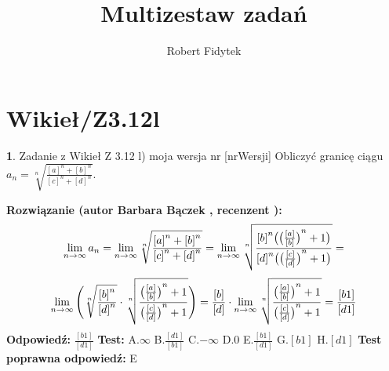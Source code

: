 \documentclass[12pt, a4paper]{article}
\title{Multizestaw zadań}
\author{Robert Fidytek}
\date{}
\theoremstyle{definition} %
\newtheorem{zad}{}
\newcommand{\kategoria}[1]{\section{#1}} %
\newcommand{\zadStart}[1]{\begin{zad}#1\newline} %
\newcommand{\zadStop}{\end{zad}}   %
\newcommand{\rozwStart}[2]{\noindent \textbf{Rozwiązanie (autor #1 , recenzent #2): }\newline} %
\newcommand{\rozwStop}{\newline}                                            %
\newcommand{\odpStart}{\noindent \textbf{Odpowiedź:}\newline}    %
\newcommand{\odpStop}{\newline}                                             %
\newcommand{\testStart}{\noindent \textbf{Test:}\newline} %
\newcommand{\testStop}{\newline} %
\newcommand{\kluczStart}{\noindent \textbf{Test poprawna odpowiedź:}\newline} %
\newcommand{\kluczStop}{\newline} %
\begin{document}
\maketitle


\kategoria{Wikieł/Z3.12l}
\zadStart{Zadanie z Wikieł Z 3.12 l) moja wersja nr [nrWersji]}
Obliczyć granicę ciągu $a_n= \sqrt[n]{\frac{{[a]}^n + {[b]}^n}{{[c]}^n +{[d]}^n}}$.
\zadStop
\rozwStart{Barbara Bączek}{}
$$\lim_{n \rightarrow \infty} a_n= \lim_{n \rightarrow \infty} \sqrt[n]{\frac{{[a]}^n + {[b]}^n}{{[c]}^n +{[d]}^n}}= \lim_{n \rightarrow \infty} \sqrt[n]{\frac{{[b]}^n\big{(}{\big{(}\frac{[a]}{[b]}\big{)}}^n +1\big{)}}{{[d]}^n\big{(}{\big{(}\frac{[c]}{[d]}\big{)}}^n +1\big{)}}}=$$
$$ \lim_{n \rightarrow \infty} \Bigg{(} \sqrt[n]{\frac{{[b]}^n}{{[d]}^n}} \cdot \sqrt[n]{\frac{{\big{(}\frac{[a]}{[b]}\big{)}}^n +1}{{\big{(}\frac{[c]}{[d]}\big{)}}^n +1}} \Bigg{)}=\frac{[b]}{[d]} \cdot \lim_{n \rightarrow \infty} \sqrt[n]{\frac{{\big{(}\frac{[a]}{[b]}\big{)}}^n +1}{{\big{(}\frac{[c]}{[d]}\big{)}}^n +1}}= \frac{[b1]}{[d1]}$$ 
\rozwStop
\odpStart
$\frac{[b1]}{[d1]}$
\odpStop
\testStart
A.$\infty$
B.$\frac{[d1]}{[b1]}$
C.$-\infty$
D.$0$
E.$\frac{[b1]}{[d1]}$
G.$[b1]$
H.$[d1]$
\testStop
\kluczStart
E
\kluczStop
\end{document}
